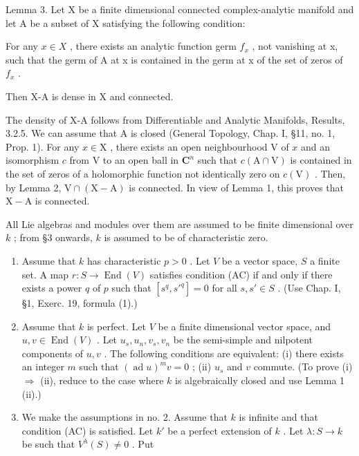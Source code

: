 Lemma 3. Let X be a finite dimensional connected complex-analytic manifold and let A be a subset of X satisfying the following condition:

For any \(x \in X\) , there exists an analytic function germ \(f_{x}\) , not vanishing at x, such that the germ of A at x is contained in the germ at x of the set of zeros of \(f_{x}\) .

Then X-A is dense in X and connected.

The density of X-A follows from Differentiable and Analytic Manifolds, Results, 3.2.5. We can assume that A is closed (General Topology, Chap. I, §11, no. 1, Prop. 1). For any \(x \in \mathrm{X}\) , there exists an open neighbourhood \(\mathrm{V}\) of \(x\) and an isomorphism \(c\) from \(\mathrm{V}\) to an open ball in \(\mathbf{C}^n\) such that \(c(\mathrm{A} \cap \mathrm{V})\) is contained in the set of zeros of a holomorphic function not identically zero on \(c(\mathrm{V})\) . Then, by Lemma 2, \(\mathrm{V} \cap (\mathrm{X} - \mathrm{A})\) is connected. In view of Lemma 1, this proves that \(\mathrm{X} - \mathrm{A}\) is connected.


All Lie algebras and modules over them are assumed to be finite dimensional over \(k\) ; from §3 onwards, \(k\) is assumed to be of characteristic zero.


\begin{enumerate}
\def\labelenumi{\arabic{enumi})}
\item
  Assume that \(k\) has characteristic \(p > 0\) . Let \(V\) be a vector space, \(S\) a finite set. A map \(r: S \to \operatorname{End}(V)\) satisfies condition (AC) if and only if there exists a power \(q\) of \(p\) such that \([s^q, s'^q] = 0\) for all \(s, s' \in S\) . (Use Chap. I, §1, Exerc. 19, formula (1).)
\item
  Assume that \(k\) is perfect. Let \(V\) be a finite dimensional vector space, and \(u, v \in \operatorname{End}(V)\) . Let \(u_s, u_n, v_s, v_n\) be the semi-simple and nilpotent components of \(u, v\) . The following conditions are equivalent: (i) there exists an integer \(m\) such that \((\operatorname{ad} u)^m v = 0\) ; (ii) \(u_s\) and \(v\) commute. (To prove (i) \(\Longrightarrow\) (ii), reduce to the case where \(k\) is algebraically closed and use Lemma 1 (ii).)
\item
  We make the assumptions in no. 2. Assume that \(k\) is infinite and that condition (AC) is satisfied. Let \(k'\) be a perfect extension of \(k\) . Let \(\lambda : S \to k\) be such that \(V^{\lambda}(S) \neq 0\) . Put
\end{enumerate}

